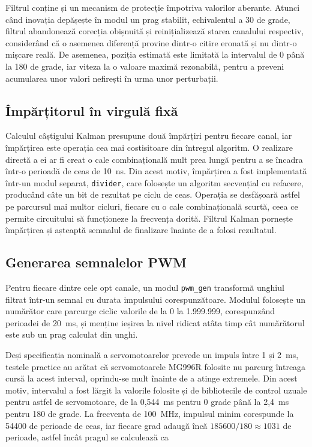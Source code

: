 Filtrul conține și un mecanism de protecție împotriva valorilor aberante. Atunci când
inovația depășește în modul un prag stabilit, echivalentul a 30 de grade, filtrul
abandonează corecția obișnuită și reinițializează starea canalului respectiv,
considerând că o asemenea diferență provine dintr-o citire eronată și nu dintr-o
mișcare reală. De asemenea, poziția estimată este limitată la intervalul de 0 până la
180 de grade, iar viteza la o valoare maximă rezonabilă, pentru a preveni acumularea
unor valori nefirești în urma unor perturbații.

\subsection{Împărțitorul în virgulă fixă}

Calculul câștigului Kalman presupune două împărțiri pentru fiecare canal, iar
împărțirea este operația cea mai costisitoare din întregul algoritm. O realizare
directă a ei ar fi creat o cale combinațională mult prea lungă pentru a se încadra
într-o perioadă de ceas de 10~ns. Din acest motiv, împărțirea a fost implementată
într-un modul separat, \texttt{divider}, care folosește un algoritm secvențial cu
refacere, producând câte un bit de rezultat pe ciclu de ceas. Operația se desfășoară
astfel pe parcursul mai multor cicluri, fiecare cu o cale combinațională scurtă, ceea
ce permite circuitului să funcționeze la frecvența dorită. Filtrul Kalman pornește
împărțirea și așteaptă semnalul de finalizare înainte de a folosi rezultatul.

\subsection{Generarea semnalelor PWM}

Pentru fiecare dintre cele opt canale, un modul \texttt{pwm\_gen} transformă unghiul
filtrat într-un semnal cu durata impulsului corespunzătoare. Modulul folosește un
numărător care parcurge ciclic valorile de la 0 la 1.999.999, corespunzând perioadei
de 20~ms, și menține ieșirea la nivel ridicat atâta timp cât numărătorul este sub un
prag calculat din unghi.

Deși specificația nominală a servomotoarelor prevede un impuls între 1 și 2~ms,
testele practice au arătat că servomotoarele MG996R folosite nu parcurg întreaga cursă
la acest interval, oprindu-se mult înainte de a atinge extremele. Din acest motiv,
intervalul a fost lărgit la valorile folosite și de bibliotecile de control uzuale
pentru astfel de servomotoare, de la 0,544~ms pentru 0 grade până la 2,4~ms pentru
180 de grade. La frecvența de 100~MHz, impulsul minim corespunde la 54400 de perioade
de ceas, iar fiecare grad adaugă încă $185600/180 \approx 1031$ de perioade, astfel
încât pragul se calculează ca

